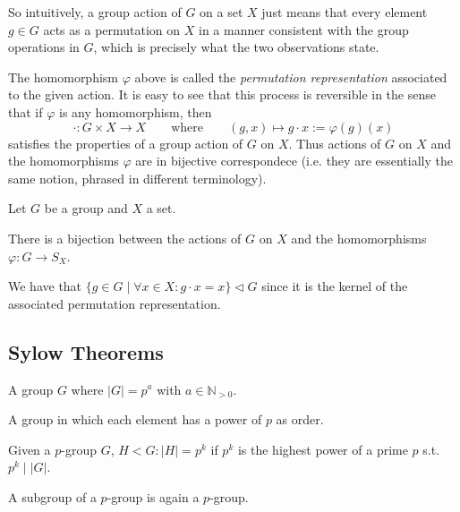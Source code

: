 So intuitively, a group action of \(G\) on a set \(X\) just means that every element \(g \in G\) acts as a permutation on \(X\) in a manner consistent with the group operations in \(G\), which is precisely what the two observations state.

The homomorphism \(\varphi\) above is called the \emph{permutation representation} associated to the given action.
It is easy to see that this process is reversible in the sense that if \(\varphi\) is any homomorphism, then
\[\cdot: G \times X \to X \qquad\text{where}\qquad (g, x) \mapsto g \cdot x := \varphi(g)(x)\]
satisfies the properties of a group action of \(G\) on \(X\).
Thus actions of \(G\) on \(X\) and the homomorphisms \(\varphi\) are in bijective correspondece (i.e. they are essentially the same notion, phrased in different terminology).

\begin{proposition}
   Let \(G\) be a group and \(X\) a set.

   There is a bijection between the actions of \(G\) on \(X\) and the homomorphisms \(\varphi: G \to S_X\).
\end{proposition}
\begin{remark}
   We have that \(\{g \in G \mid \forall x \in X: g \cdot x = x\} \triangleleft G\) since it is the kernel of the associated permutation representation.
\end{remark}

\subsection{Sylow Theorems}
\begin{definition}[\(p\)-Group]
   A group \(G\) where \(|G| = p^a\) with \(a \in \mathbb{N}_{>0}\).
\end{definition}
\begin{remark}
   A group in which each element has a power of \(p\) as order.
\end{remark}

\begin{definition}
   Given a \(p\)-group \(G\), \(H < G: \lvert H\rvert = p^k\) if \(p^k\) is the highest power of a prime \(p\) s.t. \(p^k \mid \lvert G\rvert\).
\end{definition}
\begin{remark}
   A subgroup of a \(p\)-group is again a \(p\)-group.
\end{remark}

